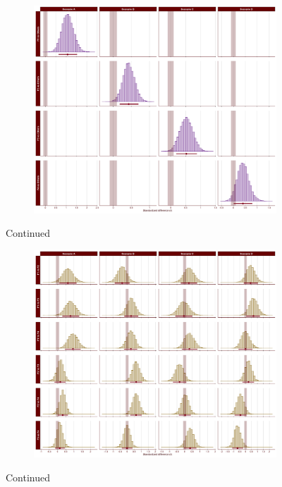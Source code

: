 \begin{appendix}
\begin{figure}[ht]\ContinuedFloat
    \centering
    \begin{subfigure}{1\textwidth}
        \includegraphics[width=\linewidth]{Figures/SE2_last_scenario_comparisons_B.png}
        \label{fig:last-scenario-comparisons-B}
    \end{subfigure}
    \caption[]{Continued}
\end{figure}

\medskip

\begin{figure}[ht]\ContinuedFloat
    \centering
    \begin{subfigure}{1\textwidth}
        \includegraphics[width=\linewidth]{Figures/SE2_last_scenario_comparisons_C.png}
        \label{fig:last-scenario-comparisons-C}
    \end{subfigure}
    \caption[]{Continued}
\end{figure}


\end{appendix}
